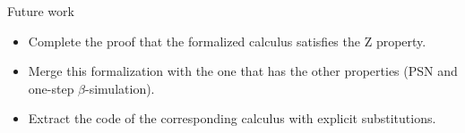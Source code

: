 \documentclass[10pt]{beamer}
\newcommand{\term}{{\mathcal{T}}}
\newcommand{\fv}[1]{{\tt fv}(#1)}
\begin{document}
\begin{frame}[fragile]{Future work}
  \begin{itemize}
  \item Complete the proof that the formalized calculus satisfies the
    Z property.
  \item Merge this formalization with the one that has the other properties (PSN and one-step $\beta$-simulation).
  \item Extract the code of the corresponding calculus with explicit substitutions.
  \end{itemize}
\end{frame}


%



\end{document}

